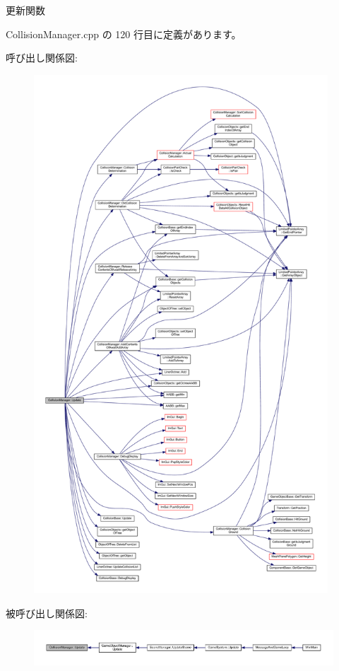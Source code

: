 更新関数 



 Collision\+Manager.\+cpp の 120 行目に定義があります。

呼び出し関係図\+:
\nopagebreak
\begin{figure}[H]
\begin{center}
\leavevmode
\includegraphics[height=550pt]{class_collision_manager_a23c21d077dbfd7ca86e7c0649d775dfc_cgraph}
\end{center}
\end{figure}
被呼び出し関係図\+:
\nopagebreak
\begin{figure}[H]
\begin{center}
\leavevmode
\includegraphics[width=350pt]{class_collision_manager_a23c21d077dbfd7ca86e7c0649d775dfc_icgraph}
\end{center}
\end{figure}


